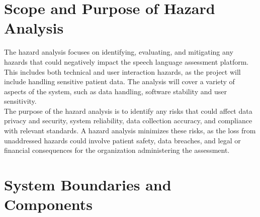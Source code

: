 \documentclass{article}
\begin{document}
\section{Scope and Purpose of Hazard Analysis}

\hspace{1.5em} The hazard analysis focuses on identifying, evaluating, and mitigating any hazards that could negatively 
impact the speech language assessment platform. This includes both technical and user interaction hazards,
as the project will include handling sensitive patient data. The analysis will cover a variety of aspects of the system, such as 
data handling, software stability and user sensitivity. \\
\indent The purpose of the hazard analysis is to identify any risks that could 
affect data privacy and security, system reliability, data collection accuracy, and compliance with relevant standards. A 
hazard analysis minimizes these risks, as the loss from unaddressed hazards could involve patient safety, data breaches, 
and legal or financial consequences for the organization administering the assessment.

\section{System Boundaries and Components}
\end{document}
